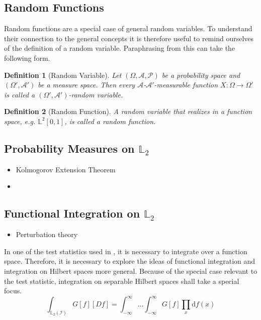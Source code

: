 \documentclass[12pt, a4paper]{article}
\theoremstyle{MAstyle} \newtheorem{assumption}{Assumption}[section]
\theoremstyle{MAstyle} \newtheorem{definition}{Definition}[section]
\begin{document}
		\subsection{Random Functions}
			Random functions are a special case of general random variables. To understand their connection to the general concepts it is therefore useful to remind ourselves of the definition of a random variable. Paraphrasing from \cite{bauer_probability_2011} this can take the following form.
			\begin{definition}[Random Variable]
				Let $\left(\Omega, \mathcal{A}, \mathcal{P}\right)$ be a probability space and $\left(\Omega', \mathcal{A}'\right)$ be a measure space. Then every $\mathcal{A}$-$\mathcal{A}'$-measurable function $X:\Omega \rightarrow \Omega'$ is called a $\left(\Omega', \mathcal{A}'\right)$-random variable.
			\end{definition}
		
			\begin{definition}[Random Function]
				A random variable that realizes in a function space, e.g. $\mathbb{L}^2[0,1]$, is called a random function.
			\end{definition}
		
		\subsection{Probability Measures on $\mathbb{L}_2$}\label{prob_measures_l2}
			\begin{itemize}
				\item Kolmogorov Extension Theorem
				\item \cite{gihman_theory_2004}
			\end{itemize}
		
		\subsection{Functional Integration on $\mathbb{L}_2$}
			\begin{itemize}
				\item Perturbation theory
			\end{itemize}
		
			In one of the test statistics used in \cite{bugni_permutation_2021}, it is necessary to integrate over a function space. Therefore, it is necessary to explore the ideas of functional integration and integration on Hilbert spaces more general. Because of the special case relevant to the test statistic, integration on separable Hilbert spaces shall take a special focus.
			\begin{equation}
				\int_{\mathbb{L}_2(\mathcal{I})} G\left[f\right] \left[Df\right] = \int_{-\infty}^{\infty}\dots\int_{-\infty}^{\infty} G\left[f\right] \prod_{x} \mathrm{d}f(x)
			\end{equation}
		
\end{document}

